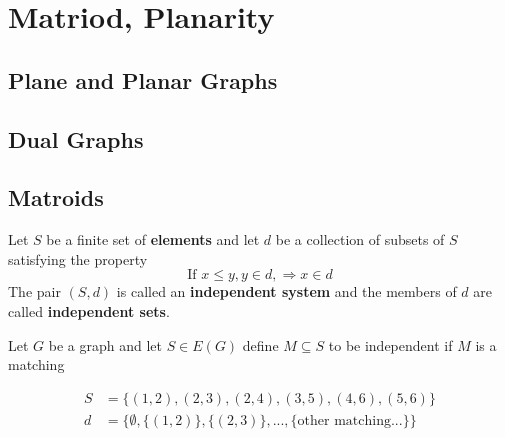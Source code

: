 	\chapter{Matriod, Planarity}
		\section{Plane and Planar Graphs}

		\section{Dual Graphs}

		\section{Matroids}
			\begin{definition}[Matroids]
				Let $S$ be a finite set of \textbf{elements} and let $d$ be a collection of subsets of $S$ satisfying the property
				\begin{equation}
					\text{If } x \le y, y\in d, \Rightarrow x \in d
				\end{equation}
				The pair $(S, d)$ is called an \textbf{independent system} and the members of $d$ are called \textbf{independent sets}.
			\end{definition}

			\begin{example}
				Let $G$ be a graph and let $S \in E(G)$ define $M\subseteq S$ to be independent if $M$ is a matching
			\end{example}

			\begin{figure}
				\centering
			\end{figure}

			\begin{align}
				S &= \{(1, 2), (2, 3), (2, 4), (3, 5), (4, 6), (5, 6)\} \\
				d &= \{\emptyset, \{(1, 2)\}, \{(2, 3)\}, ... , \{\text{other matching...}\}\}
			\end{align}

